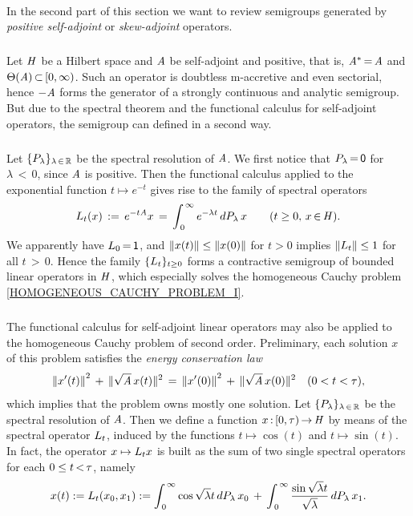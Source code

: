 \documentclass[11pt,twoside]{article}
\begin{document}
\paragraph{} %
In the second part of this section we want to review semigroups
generated by \textit{positive self-adjoint} or \textit{skew-adjoint} operators.

\subparagraph{}
Let $\mathit{H}$ be a Hilbert space and $\mathit{A}$ be self-adjoint and positive,
that is,
$\mathit{A}^* {\,=\,} \mathit{A}$ and $\Theta(\mathit{A}) {\,\subset\,} [0,\infty)$.
Such an operator is doubtless m-accretive and even sectorial,
hence ${-}\mathit{A}$ forms the generator
of a strongly continuous and analytic semigroup.
But due to the spectral theorem and the functional calculus
for self-adjoint operators,
the semigroup can defined in a second way.

\subparagraph{} %
Let $\{ P_{\lambda} \}_{\lambda {\,\in\,} {\mathbb{R}}}$
be the spectral resolution of $\mathit{A}$.
We first notice that $P_{\lambda} {\,=\,} {\mathsf{0}}$ for $\lambda {\,<\,} 0$,
since $\mathit{A}$ is positive.
Then the functional calculus applied to the exponential function
$t \mapsto e^{-t}$ gives rise to the family of spectral operators
\[
{L}_t(x) \,:=\, e^{-t \mathit{A}} x
\,=\,
\int_{\,0}^{\,\infty} e^{-\lambda t} \, dP_{\lambda} \, x
\quad \quad (t \geq 0, \, x {\,\in\,} \mathit{H}).
\]
We apparently have ${L}_0 {\,=\,} {\mathsf{1}}$,
and $\left\lVert x(t) \right\rVert \leq \left\lVert x(0) \right\rVert$ for $t>0$ implies
$\left\lVert {L}_t \right\rVert \leq 1$ for all $t {\,>\,} 0$.
Hence the family $\{ {L}_t\}_{t \geq 0}$ forms a contractive semigroup
of bounded linear operators in $\mathit{H}$,
which especially solves the homogeneous Cauchy problem
\eqref{HOMOGENEOUS_CAUCHY_PROBLEM_I}.

\subparagraph{} %
The functional calculus for self-adjoint linear operators
may also be applied to the homogeneous Cauchy problem of second order.
Preliminary,
each solution $x$ of this problem satisfies
the \textit{energy conservation law}
\[
\left\lVert x'(t) \right\rVert^2 \,+\, \lVert \sqrt{\mathit{A}} \, x(t) \rVert^2
\,=\,
\left\lVert x'(0) \right\rVert^2 \,+\, \lVert \sqrt{\mathit{A}} \, x(0) \rVert^2
\quad (0 < t < \tau),
\]
which implies that the problem owns mostly one solution.
Let $\{{P}_{\lambda}\}_{\lambda {\,\in\,} {\mathbb{R}}}$ be
the spectral resolution of $\mathit{A}$.
Then we define a function $x {\,:\,} [0,\tau) {\,\to\,} \mathit{H}$
by means of the spectral operator ${L}_t$,
induced by the functions $t \mapsto \cos(t)$ and $t \mapsto \sin(t)$.
In fact,
the operator $x \mapsto {L}_t x$
is built as the sum of two single spectral operators
for each $0 \leq t {\,<\,} \tau$,
namely
\[
x(t)
:=
{L}_t(x_0,x_1)
:=
\int_{\,0}^{\,\infty} \cos{\sqrt{\lambda}t} \, dP_{\lambda} \, x_0
\,+\,
\int_{\,0}^{\,\infty} \frac{\sin{\sqrt{\lambda}t}}{\sqrt{\lambda}}
\, dP_{\lambda} \, x_1.
\]
\end{document}
